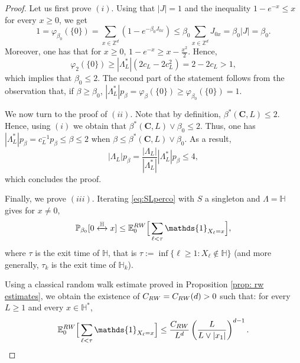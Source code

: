 \documentclass[11pt,a4paper]{article}
\numberwithin{equation}{section}
\theoremstyle{plain}
\theoremstyle{definition}
\newcommand\bfC{\mathbf{C}}
\newcommand{\connect}{\xleftrightarrow}
\begin{document}
\begin{proof}Let us first prove $(i)$. Using that $|J|=1$ and the inequality $1-e^{-x}\leq x$ for every $x\geq 0$, we get
\begin{equation}
1=\varphi_{\beta_0}(\{0\})= \sum_{x\in \mathbb Z^d}(1-e^{-\beta_0J_{0x}})\leq \beta_0\sum_{x\in \mathbb Z^d}J_{0x}=\beta_0|J|=\beta_0.
\end{equation}
Moreover, one has that for $x\geq 0$, $1-e^{-x}\geq x-\tfrac{x^2}{2}$. Hence, 
\begin{equation}\varphi_{2}(\{0\})\geq |\Lambda_L^*|(2c_L-2c_L^2)=2-2c_L>1,
\end{equation} 
which implies that $\beta_0\leq 2$. The second part of the statement follows from the observation that, if $\beta\geq \beta_0$, $|\Lambda_L^*|p_\beta=\varphi_\beta(\{0\})\geq \varphi_{\beta_0}(\{0\})= 1$.

We now turn to the proof of $(ii)$. Note that by definition, ${\beta^*(\bfC,L)\leq 2}$. Hence, using $(i)$ we obtain that $\beta^*(\bfC,L)\vee \beta_0\leq 2$. Thus, one has $|\Lambda_L^*|p_\beta=c_L^{-1}p_\beta\leq \beta\leq 2$ when $\beta\leq \beta^*(\bfC,L)\vee \beta_0$. As a result,
\begin{equation}
	|\Lambda_L|p_\beta=\frac{|\Lambda_L|}{|\Lambda_L^*|}|\Lambda_L^*|p_\beta\leq  4,
\end{equation}
which concludes the proof.


Finally, we prove $(iii)$. Iterating \eqref{eq:SLperco} with $S$ a singleton and $\Lambda=\mathbb H$ gives for $x\neq 0$,
\begin{equation}\label{eq: iterated sl for beta_0}
		\mathbb P_{\beta_0}[0\connect{\mathbb H\:}x]\leq \mathbb E_0^{\rm RW}\Big[\sum_{\ell<\tau}\mathds{1}_{X_\ell=x}\Big],
\end{equation}
where $\tau$ is the exit time of $\mathbb H$, that is $\tau:=\inf\{\ell\geq 1: X_\ell\notin \mathbb H\}$ (and more generally, $\tau_k$ is the exit time of $\mathbb H_k$). 

Using a classical random walk estimate proved in Proposition \ref{prop: rw estimates}, we obtain the existence of $C_{\rm RW}=C_{\rm RW}(d)>0$ such that: for every $L\geq 1$ and every $x\in \mathbb H^*$,
\begin{equation}\label{eq: bound green function half space}
	\mathbb E_0^{\rm RW}\Big[\sum_{\ell<\tau}\mathds{1}_{X_\ell=x}\Big]\leq \frac{C_{\rm RW}}{L^d}\left(\frac{L}{L\vee |x_1|}\right)^{d-1}.
\end{equation}


\end{proof}
\end{document}
